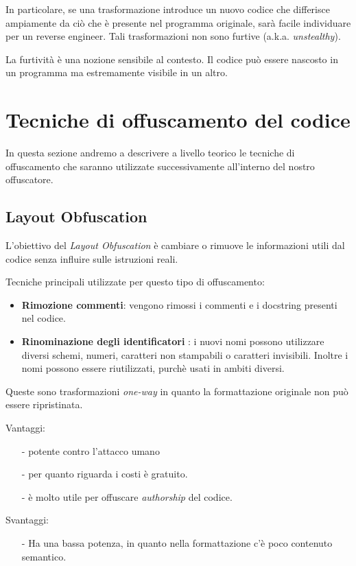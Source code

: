 \documentclass[a4paper,oneside,openright,titlepage,10pt,footinclude,headinclude]{scrbook}
\begin{document}
In particolare, se una trasformazione introduce un nuovo codice che differisce ampiamente da ciò che è presente nel programma originale, sarà facile individuare per un reverse engineer. Tali trasformazioni non sono furtive (a.k.a. \emph{unstealthy}).

La furtività è una nozione sensibile al contesto. Il codice può essere nascosto in un programma ma estremamente visibile in un altro.\\

\section{Tecniche di offuscamento del codice}
In questa sezione andremo a descrivere a livello teorico le tecniche di offuscamento che saranno utilizzate successivamente all'interno del nostro offuscatore.

\subsection{Layout Obfuscation}
L'obiettivo del \emph{Layout Obfuscation} è cambiare o rimuove le informazioni utili dal codice senza influire sulle istruzioni reali.\medskip


\noindent Tecniche principali utilizzate per questo tipo di offuscamento:
\begin{itemize}
\item
\textbf{Rimozione commenti}: vengono rimossi i commenti e i docstring presenti nel codice.
\item
\textbf{Rinominazione degli identificatori }: i nuovi nomi possono utilizzare diversi schemi, numeri, caratteri non stampabili o caratteri invisibili. Inoltre i nomi possono essere riutilizzati, purchè usati in ambiti diversi.
\end{itemize}

\noindent Queste sono trasformazioni \emph{one-way} in quanto la formattazione originale non può essere ripristinata.\medskip

Vantaggi: 
\begin{itemize}
\item[-]
potente contro l'attacco umano
\item[-]
per quanto riguarda i costi è gratuito.
\item[-]
è molto utile per offuscare \emph{authorship} del codice.
\end{itemize}

Svantaggi:
\begin{itemize}
\item[-]
Ha una bassa potenza, in quanto nella formattazione c'è poco contenuto semantico. 
\end{itemize}
\end{document}
